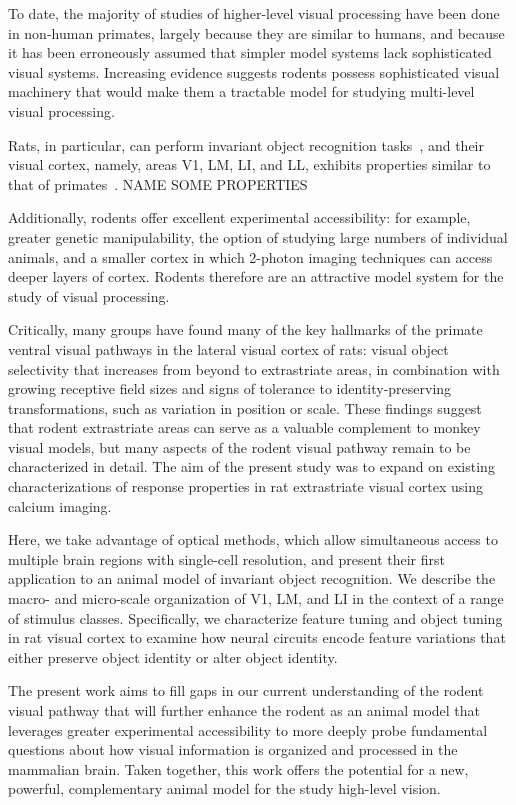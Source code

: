 To date, the majority of studies of higher-level visual processing have been done in non-human primates, largely because they are similar to humans, and because it has been erroneously assumed that simpler model systems lack sophisticated visual systems. Increasing evidence suggests rodents possess sophisticated visual machinery that would make them a tractable model for studying multi-level visual processing.

Rats, in particular, can perform invariant object recognition tasks~\cite{Zoccolan2009, Tafazoli2012Transformation-TolerantPriming, cite}, and their visual cortex, namely, areas V1, LM, LI, and LL, exhibits properties similar to that of primates~\cite{Tafazoli2017, Vermaercke2014, Matteucci2019b, cite}. {NAME SOME PROPERTIES}

Additionally, rodents offer excellent experimental accessibility: for example, greater genetic manipulability, the option of studying large numbers of individual animals, and a smaller cortex in which 2-photon imaging techniques can access deeper layers of cortex. Rodents therefore are an attractive model system for the study of visual processing.

Critically, many groups \cite{EVERYONE} have found many of the key hallmarks of the primate ventral visual pathways in the lateral visual cortex of rats: visual object selectivity that increases from beyond to extrastriate areas, in combination with growing receptive field sizes and signs of tolerance to identity-preserving transformations, such as variation in position or scale. These findings suggest that rodent extrastriate areas can serve as a valuable complement to monkey visual models, but many aspects of the rodent visual pathway remain to be characterized in detail. The aim of the present study was to expand on existing characterizations of response properties in rat extrastriate visual cortex using calcium imaging.


Here, we take advantage of optical methods, which allow simultaneous access to multiple brain regions with single-cell resolution, and present their first application to an animal model of invariant object recognition. We describe the macro- and micro-scale organization of V1, LM, and LI in the context of a range of stimulus classes. Specifically, we characterize feature tuning and object tuning in rat visual cortex to examine how neural circuits encode feature variations that either preserve object identity or alter object identity. 


The present work aims to fill gaps in our current understanding of the rodent visual pathway that will further enhance the rodent as an animal model that leverages greater experimental accessibility to more deeply probe fundamental questions about how visual information is organized and processed in the mammalian brain. Taken together, this work offers the potential for a new, powerful, complementary animal model for the study high-level vision.



